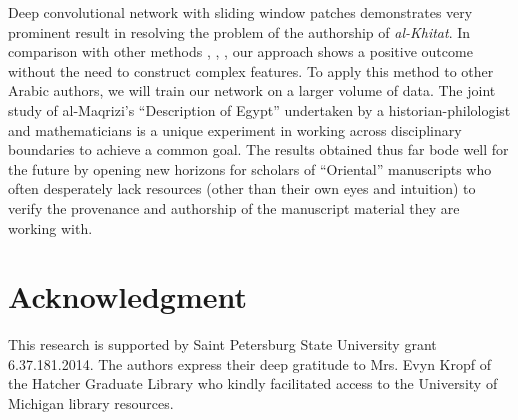\documentclass[conference,a4paper]{ieeetran}
\begin{document}
Deep convolutional network with sliding window patches demonstrates very prominent result in resolving the problem of the authorship of {\it al-Khitat}. In comparison with other methods \cite{MBulacu}, \cite{MBulacu1}, \cite{DFecker}, \cite{Salvador} our approach shows a positive outcome without the need to construct complex features. To apply this method to other Arabic authors, we will train our network on a larger volume of data. The joint study of al-Maqrizi's ``Description of Egypt'' undertaken by a historian-philologist and mathematicians is a unique experiment in working across disciplinary boundaries to achieve a common goal. The results obtained thus far bode well for the future by opening new horizons for scholars of ``Oriental'' manuscripts who often desperately lack resources (other than their own eyes and intuition) to verify the provenance and authorship of the manuscript material they are working with.

\section*{Acknowledgment}
 This research is supported by Saint Petersburg State University grant 6.37.181.2014. The authors express their deep gratitude to Mrs. Evyn Kropf of the Hatcher Graduate Library who kindly facilitated access to the University of Michigan library resources.
 
\end{document}
